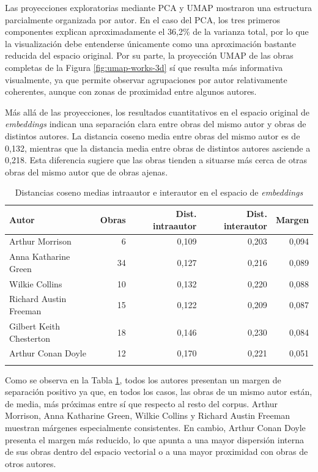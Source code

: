 \documentclass[IB]{TFUOC}%
\begin{document}
Las proyecciones exploratorias mediante PCA y UMAP mostraron una estructura parcialmente organizada por autor. En el caso del PCA, los tres primeros componentes explican aproximadamente el 36,2\% de la varianza total, por lo que la visualización debe entenderse únicamente como una aproximación bastante reducida del espacio original. Por su parte, la proyección UMAP de las obras completas de la Figura \ref{fig:umap-works-3d} sí que resulta más informativa visualmente, ya que permite observar agrupaciones por autor relativamente coherentes, aunque con zonas de proximidad entre algunos autores.

Más allá de las proyecciones, los resultados cuantitativos en el espacio original de \textit{embeddings} indican una separación clara entre obras del mismo autor y obras de distintos autores. La distancia coseno media entre obras del mismo autor es de 0,132, mientras que la distancia media entre obras de distintos autores asciende a 0,218. Esta diferencia sugiere que las obras tienden a situarse más cerca de otras obras del mismo autor que de obras ajenas.

\begin{longtable}{|l|r|r|r|r|}
\hline
\textbf{Autor} & \textbf{Obras} & \textbf{Dist. intraautor} & \textbf{Dist. interautor} & \textbf{Margen} \\
\hline
Arthur Morrison & 6 & 0,109 & 0,203 & 0,094 \\
\hline
Anna Katharine Green & 34 & 0,127 & 0,216 & 0,089 \\
\hline
Wilkie Collins & 10 & 0,132 & 0,220 & 0,088 \\
\hline
Richard Austin Freeman & 15 & 0,122 & 0,209 & 0,087 \\
\hline
Gilbert Keith Chesterton & 18 & 0,146 & 0,230 & 0,084 \\
\hline
Arthur Conan Doyle & 12 & 0,170 & 0,221 & 0,051 \\
\hline
\caption{Distancias coseno medias intraautor e interautor en el espacio de \textit{embeddings}}
\label{tab:embedding_cohesion}
\end{longtable}

Como se observa en la Tabla \ref{tab:embedding_cohesion}, todos los autores presentan un margen de separación positivo ya que, en todos los casos, las obras de un mismo autor están, de media, más próximas entre sí que respecto al resto del corpus. Arthur Morrison, Anna Katharine Green, Wilkie Collins y Richard Austin Freeman muestran márgenes especialmente consistentes. En cambio, Arthur Conan Doyle presenta el margen más reducido, lo que apunta a una mayor dispersión interna de sus obras dentro del espacio vectorial o a una mayor proximidad con obras de otros autores.
\end{document}
